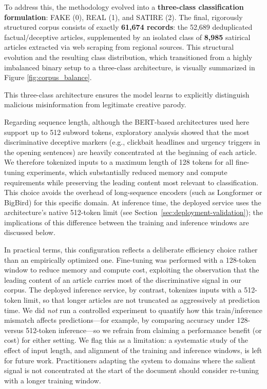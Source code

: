 \documentclass[informatics,article,submit,pdftex,moreauthors]{Definitions/mdpi}
\begin{document}
To address this, the methodology evolved into a \textbf{three-class classification formulation}: FAKE (0), REAL (1), and SATIRE (2). The final, rigorously structured corpus consists of exactly \textbf{61,674 records}: the 52,689 deduplicated factual/deceptive articles, supplemented by an isolated class of \textbf{8,985} satirical articles extracted via web scraping from regional sources. This structural evolution and the resulting class distribution, which transitioned from a highly imbalanced binary setup to a three-class architecture, is visually summarized in Figure \ref{fig:corpus_balance}.

This three-class architecture ensures the model learns to explicitly distinguish malicious misinformation from legitimate creative parody.

Regarding sequence length, although the BERT-based architectures used here support up to 512 subword tokens, exploratory analysis showed that the most discriminative deceptive markers (e.g., clickbait headlines and urgency triggers in the opening sentences) are heavily concentrated at the beginning of each article. We therefore tokenized inputs to a maximum length of 128 tokens for all fine-tuning experiments, which substantially reduced memory and compute requirements while preserving the leading content most relevant to classification. This choice avoids the overhead of long-sequence encoders (such as Longformer or BigBird) for this specific domain. At inference time, the deployed service uses the architecture's native 512-token limit (see Section~\ref{sec:deployment-validation}); the implications of this difference between the training and inference windows are discussed below.

In practical terms, this configuration reflects a deliberate efficiency choice rather than an empirically optimized one. Fine-tuning was performed with a 128-token window to reduce memory and compute cost, exploiting the observation that the leading content of an article carries most of the discriminative signal in our corpus. The deployed inference service, by contrast, tokenizes inputs with a 512-token limit, so that longer articles are not truncated as aggressively at prediction time. We did \emph{not} run a controlled experiment to quantify how this train/inference mismatch affects predictions—for example, by comparing accuracy under 128- versus 512-token inference—so we refrain from claiming a performance benefit (or cost) for either setting. We flag this as a limitation: a systematic study of the effect of input length, and alignment of the training and inference windows, is left for future work. Practitioners adapting the system to domains where the salient signal is not concentrated at the start of the document should consider re-tuning with a longer training window.
\end{document}
